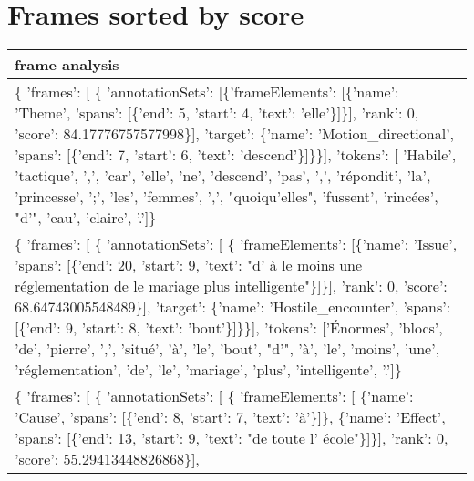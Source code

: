 \documentclass{article}%
\begin{document}
\section{Frames sorted by score}%
\label{sec:Frames sorted by score}%
\begin{longtable}{|p{15.5cm}|}%
\hline%
frame analysis\\%
\hline%
\endhead%
\hline%
\endfoot%
\endlastfoot%
\{ 'frames': {[} \{ 'annotationSets': {[}\{'frameElements': {[}\{'name': 'Theme', 'spans': {[}\{'end': 5, 'start': 4, 'text': 'elle'\}{]}\}{]}, 'rank': 0, 'score': 84.17776757577998\}{]},\newline%
                'target': \{'name': 'Motion\_directional', 'spans': {[}\{'end': 7, 'start': 6, 'text': 'descend'\}{]}\}\}{]},\newline%
  'tokens': {[} 'Habile', 'tactique', ',', 'car', 'elle', 'ne', 'descend', 'pas', ',', 'répondit', 'la', 'princesse', ';', 'les', 'femmes', ',', "quoiqu'elles", 'fussent', 'rincées', "d'", 'eau',\newline%
              'claire', '.'{]}\}\\%
\hline%
\{ 'frames': {[} \{ 'annotationSets': {[} \{ 'frameElements': {[}\{'name': 'Issue', 'spans': {[}\{'end': 20, 'start': 9, 'text': "d' à le moins une réglementation de le mariage plus intelligente"\}{]}\}{]},\newline%
                                      'rank': 0,\newline%
                                      'score': 68.64743005548489\}{]},\newline%
                'target': \{'name': 'Hostile\_encounter', 'spans': {[}\{'end': 9, 'start': 8, 'text': 'bout'\}{]}\}\}{]},\newline%
  'tokens': {[}'Énormes', 'blocs', 'de', 'pierre', ',', 'situé', 'à', 'le', 'bout', "d'", 'à', 'le', 'moins', 'une', 'réglementation', 'de', 'le', 'mariage', 'plus', 'intelligente', '.'{]}\}\\%
\hline%
\{ 'frames': {[} \{ 'annotationSets': {[} \{ 'frameElements': {[} \{'name': 'Cause', 'spans': {[}\{'end': 8, 'start': 7, 'text': 'à'\}{]}\},\newline%
                                                         \{'name': 'Effect', 'spans': {[}\{'end': 13, 'start': 9, 'text': "de toute l' école"\}{]}\}{]},\newline%
                                      'rank': 0,\newline%
                                      'score': 55.29413448826868\}{]},\newline%

\end{longtable}
\end{document}
